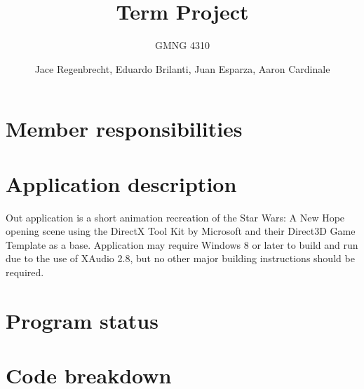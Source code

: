 \documentclass[a4paper]{scrartcl}
\title{Term Project}
\subtitle{GMNG 4310}
\author{Jace Regenbrecht, Eduardo Brilanti, Juan Esparza, Aaron Cardinale}
\begin{document}
\maketitle

\section{Member responsibilities}

\section{Application description}

Out application is a short animation recreation of the Star Wars: A New Hope opening scene using the DirectX Tool Kit by Microsoft\cite{directxtk} and their Direct3D Game Template\cite{d3dtemplate} as a base. Application may require Windows 8 or later to build and run due to the use of XAudio 2.8, but no other major building instructions should be required.


\section{Program status}

\section{Code breakdown}



\end{document}
